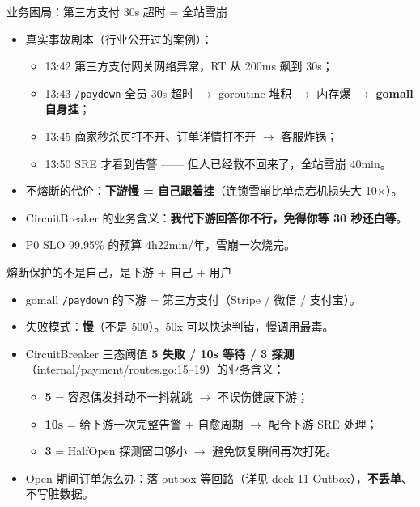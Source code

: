 \documentclass[aspectratio=169,11pt]{beamer}
\begin{document}
\begin{frame}[shrink]{业务困局：第三方支付 30s 超时 = 全站雪崩}
\begin{itemize}
  \item 真实事故剧本（行业公开过的案例）：
  \begin{itemize}
    \item 13:42 第三方支付网关网络异常，RT 从 200ms 飙到 30s；
    \item 13:43 \texttt{/paydown} 全员 30s 超时 $\to$ goroutine 堆积 $\to$ 内存爆 $\to$ \textbf{gomall 自身挂}；
    \item 13:45 商家秒杀页打不开、订单详情打不开 $\to$ 客服炸锅；
    \item 13:50 SRE 才看到告警 —— 但人已经救不回来了，全站雪崩 40min。
  \end{itemize}
  \item 不熔断的代价：\textbf{下游慢 = 自己跟着挂}（连锁雪崩比单点宕机损失大 10$\times$）。
  \item CircuitBreaker 的业务含义：\textbf{我代下游回答你不行，免得你等 30 秒还白等}。
  \item P0 SLO 99.95\% 的预算 4h22min/年，雪崩一次烧完。
\end{itemize}
\end{frame}

\begin{frame}[shrink]{熔断保护的不是自己，是下游 + 自己 + 用户}
\begin{itemize}
  \item gomall \texttt{/paydown} 的下游 = 第三方支付（Stripe / 微信 / 支付宝）。
  \item 失败模式：\textbf{慢}（不是 500）。50x 可以快速判错，慢调用最毒。
  \item CircuitBreaker 三态阈值 \textbf{5 失败 / 10s 等待 / 3 探测}（internal/payment/routes.go:15--19）的业务含义：
  \begin{itemize}
    \item \textbf{5} = 容忍偶发抖动不一抖就跳 $\to$ 不误伤健康下游；
    \item \textbf{10s} = 给下游一次完整告警 + 自愈周期 $\to$ 配合下游 SRE 处理；
    \item \textbf{3} = HalfOpen 探测窗口够小 $\to$ 避免恢复瞬间再次打死。
  \end{itemize}
  \item Open 期间订单怎么办：落 outbox 等回路（详见 deck 11 Outbox），\textbf{不丢单}、不写脏数据。
\end{itemize}
\end{frame}
\end{document}
